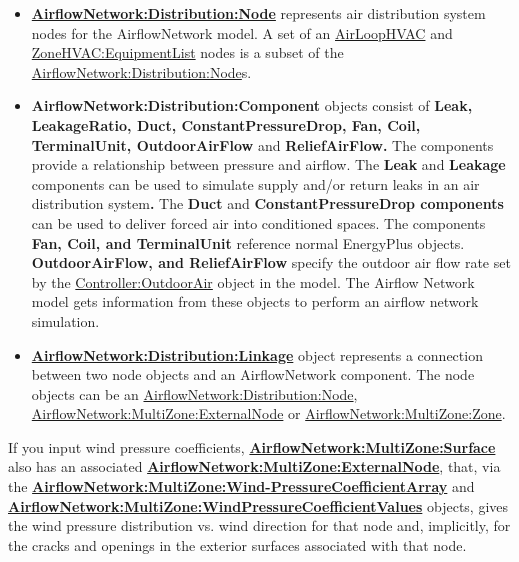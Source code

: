 \begin{itemize}
\item
  \textbf{\hyperref[airflownetworkdistributionnode]{AirflowNetwork:Distribution:Node}} represents air distribution system nodes for the AirflowNetwork model. A set of an \hyperref[airloophvac]{AirLoopHVAC} and \hyperref[zonehvacequipmentlist]{ZoneHVAC:EquipmentList} nodes is a subset of the \hyperref[airflownetworkdistributionnode]{AirflowNetwork:Distribution:Node}s.
\item
  \textbf{AirflowNetwork:Distribution:Component} objects consist of \textbf{Leak, LeakageRatio, Duct, ConstantPressureDrop, Fan, Coil, TerminalUnit, OutdoorAirFlow} and \textbf{ReliefAirFlow.} The components provide a relationship between pressure and airflow. The \textbf{Leak} and \textbf{Leakage} components can be used to simulate supply and/or return leaks in an air distribution system\textbf{.} The \textbf{Duct} and \textbf{ConstantPressureDrop components} can be used to deliver forced air into conditioned spaces. The components \textbf{Fan, Coil, and TerminalUnit} reference normal EnergyPlus objects. \textbf{OutdoorAirFlow, and ReliefAirFlow} specify the outdoor air flow rate set by the \hyperref[controlleroutdoorair]{Controller:OutdoorAir} object in the model. The Airflow Network model gets information from these objects to perform an airflow network simulation.
\item
  \textbf{\hyperref[airflownetworkdistributionlinkage]{AirflowNetwork:Distribution:Linkage}} object represents a connection between two node objects and an AirflowNetwork component. The node objects can be an \hyperref[airflownetworkdistributionnode]{AirflowNetwork:Distribution:Node}, \hyperref[airflownetworkmultizoneexternalnode]{AirflowNetwork:MultiZone:ExternalNode} or \hyperref[airflownetworkmultizonezone]{AirflowNetwork:MultiZone:Zone}.
\end{itemize}

If you input wind pressure coefficients, \textbf{\hyperref[airflownetworkmultizonesurface]{AirflowNetwork:MultiZone:Surface}} also has an associated \textbf{\hyperref[airflownetworkmultizoneexternalnode]{AirflowNetwork:MultiZone:ExternalNode}}, that, via the \textbf{\hyperref[airflownetworkmultizonewindpressurecoefficientarray]{AirflowNetwork:MultiZone:Wind-PressureCoefficientArray}} and \textbf{\hyperref[airflownetworkmultizonewindpressurecoefficientvalues]{AirflowNetwork:MultiZone:WindPressureCoefficientValues}} objects, gives the wind pressure distribution vs. wind direction for that node and, implicitly, for the cracks and openings in the exterior surfaces associated with that node.

